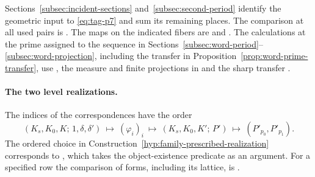 Sections~\ref{subsec:incident-sections} and~\ref{subsec:second-period}
identify the geometric input to \eqref{eq:tag-p7} and sum its remaining places.
The comparison at all used pairs is .
The maps on the indicated fibers are 
and . The calculations at the prime assigned to the sequence
in Sections~\ref{subsec:word-period}--\ref{subsec:word-projection},
including the transfer in Proposition~\ref{prop:word-prime-transfer}, use , the measure and finite projections
in  and the sharp transfer
\allowbreak{}.
\cite{release-site-reading,release-second-period,release-word-measure,release-word-transfer}

\paragraph{The two level realizations.}
The indices of the correspondences have the order
\[
 (K_s,K_0,K;\,1,\delta,\delta')\ \longmapsto\ (\varphi_i)_i
      \ \longmapsto\ (K_s,K_0,K';\,P')
      \ \longmapsto\ (P'_{p_0},P'_{p_1}).
\]
The ordered choice in Construction~\ref{hyp:family-prescribed-realization} corresponds to
\href{https://github.com/Deicyde/riemann-hypothesis/blob/a172c464fd4bcfc4f53e394dcba45d742b1409a6/src/Development/AutomorphicArithmetic/CharacterBoxes/KitS.lean\#L14}{}, which takes the object-existence predicate  as an argument. For a specified row the comparison of forms, including its lattice, is
\href{https://github.com/Deicyde/riemann-hypothesis/blob/a172c464fd4bcfc4f53e394dcba45d742b1409a6/src/Development/AbelianVarietyTheory/Proofs/SatakeParameters/RowFormsMatchPeriodMapOfFurtherProperties.lean\#L131}{}.

